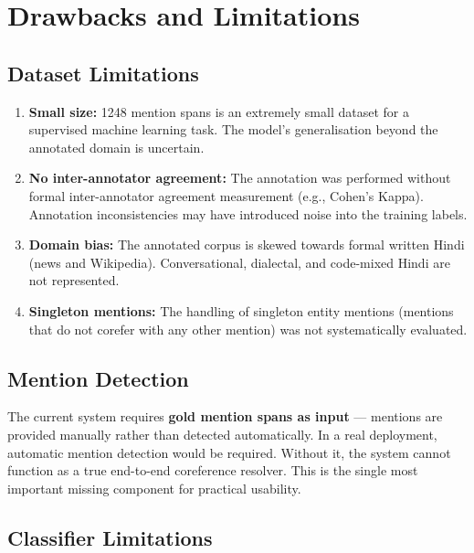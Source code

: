 \documentclass[12pt,a4paper]{report}
\begin{document}
\section{Drawbacks and Limitations}

\subsection{Dataset Limitations}

\begin{enumerate}
    \item \textbf{Small size:} 1248 mention spans is an extremely small dataset for a supervised machine learning task. The model's generalisation beyond the annotated domain is uncertain.
    \item \textbf{No inter-annotator agreement:} The annotation was performed without formal inter-annotator agreement measurement (e.g., Cohen's Kappa). Annotation inconsistencies may have introduced noise into the training labels.
    \item \textbf{Domain bias:} The annotated corpus is skewed towards formal written Hindi (news and Wikipedia). Conversational, dialectal, and code-mixed Hindi are not represented.
    \item \textbf{Singleton mentions:} The handling of singleton entity mentions (mentions that do not corefer with any other mention) was not systematically evaluated.
\end{enumerate}

\subsection{Mention Detection}

The current system requires \textbf{gold mention spans as input} --- mentions are provided manually rather than detected automatically. In a real deployment, automatic mention detection would be required. Without it, the system cannot function as a true end-to-end coreference resolver. This is the single most important missing component for practical usability.

\subsection{Classifier Limitations}
\end{document}
